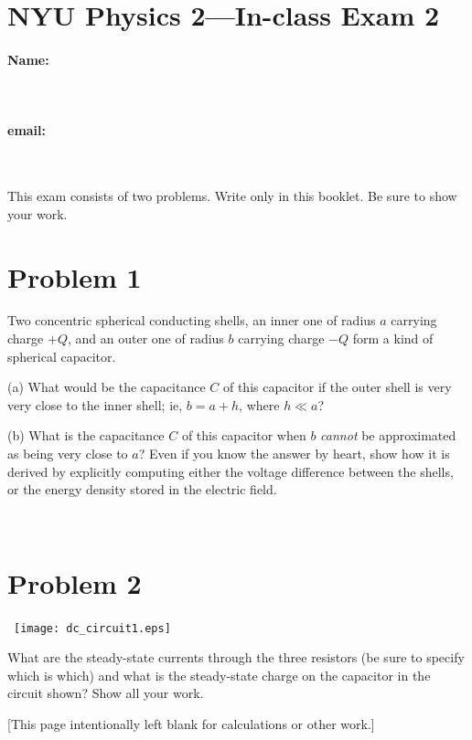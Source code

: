 \documentclass[12pt]{article}
\begin{document}
\section*{NYU Physics 2---In-class Exam 2}

\vfill

\paragraph{Name:} ~
\paragraph{email:} ~

\vfill
\noindent
\resizebox{\textwidth}{!}{}
\vfill

This exam consists of two problems.  Write only in this booklet.  Be
sure to show your work.

\clearpage

\section*{Problem 1}

Two concentric spherical conducting shells, an inner one of radius $a$
carrying charge $+Q$, and an outer one of radius $b$ carrying charge
$-Q$ form a kind of spherical capacitor.

(a) What would be the capacitance $C$ of this capacitor if the outer
shell is very very close to the inner shell; ie, $b=a+h$, where $h\ll
a$?

\vfill

(b) What is the capacitance $C$ of this capacitor when $b$
\emph{cannot} be approximated as being very close to $a$?  Even if you
know the answer by heart, show how it is derived by explicitly
computing either the voltage difference between the shells, or the
energy density stored in the electric field.

\vfill ~

\clearpage

\section*{Problem 2}

~\hfill\texttt{[image: dc\_circuit1.eps]}\hfill~

What are the steady-state currents through the three resistors (be
sure to specify which is which) and what is the steady-state charge on
the capacitor in the circuit shown?  Show all your work.

\clearpage

[This page intentionally left blank for calculations or other work.]
\end{document}
